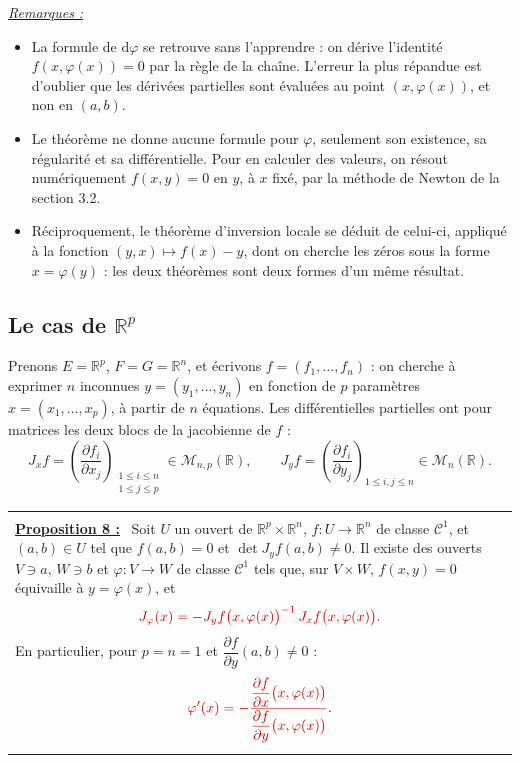 \documentclass[a4paper,twoside]{report}
\makeatletter
\newcommand{\rmath}[1]{\textcolor{rougecours}{#1}}
\newenvironment{cadre}%
 {\par\vspace{2mm}\noindent\begin{tabular}{|@{\hspace{4mm}}p{0.93\textwidth}@{\hspace{4mm}}|}
  \hline \\[-2mm]}%
 {\\[2mm] \hline \end{tabular}\par\vspace{3mm}}
\newcommand{\propo}[1]{\textbf{\underline{Proposition #1 :}}~}
\newenvironment{remarques}%
 {\par\needspace{6\baselineskip}\vspace{1mm}\begin{list}{}{\leftmargin=1cm \rightmargin=0.5cm}\item[]%
  \textit{\underline{Remarques :}}%
  \begin{itemize}[label=$\bullet$,leftmargin=0.45cm,topsep=3pt,itemsep=4pt]}%
 {\end{itemize}\end{list}\vspace{1mm}}
\newcommand{\R}{\mathbb{R}}
\newcommand{\dd}{\mathrm{d}}                      %
\newcommand{\Cc}{\mathcal{C}}                     %
\newcommand{\dpd}[2]{\dfrac{\partial #1}{\partial #2}}  %
\newcommand{\Jac}{J}                              %
\makeatother
\begin{document}
\begin{remarques}
  \item La formule de $\dd\varphi$ se retrouve sans l'apprendre : on dérive l'identité $f(x, \varphi(x)) = 0$ par la règle de la chaîne. L'erreur la plus répandue est d'oublier que les dérivées partielles sont évaluées au point $(x, \varphi(x))$, et non en $(a, b)$.
  \item Le théorème ne donne aucune formule pour $\varphi$, seulement son existence, sa régularité et sa différentielle. Pour en calculer des valeurs, on résout numériquement $f(x, y) = 0$ en $y$, à $x$ fixé, par la méthode de Newton de la section 3.2.
  \item Réciproquement, le théorème d'inversion locale se déduit de celui-ci, appliqué à la fonction $(y, x) \mapsto f(x) - y$, dont on cherche les zéros sous la forme $x = \varphi(y)$ : les deux théorèmes sont deux formes d'un même résultat.
\end{remarques}

\subsection{Le cas de \texorpdfstring{$\R^{p}$}{R\textasciicircum p}}

Prenons $E = \R^{p}$, $F = G = \R^{n}$, et écrivons $f = (f_{1}, \dots, f_{n})$ : on cherche à exprimer $n$ inconnues $y = (y_{1}, \dots, y_{n})$ en fonction de $p$ paramètres $x = (x_{1}, \dots, x_{p})$, à partir de $n$ équations. Les différentielles partielles ont pour matrices les deux blocs de la jacobienne de $f$ :
\[ \Jac_{x} f = \left(\dpd{f_{i}}{x_{j}}\right)_{\substack{1 \leqslant i \leqslant n \\ 1 \leqslant j \leqslant p}} \in \mathcal{M}_{n, p}(\R), \qquad \Jac_{y} f = \left(\dpd{f_{i}}{y_{j}}\right)_{1 \leqslant i, j \leqslant n} \in \mathcal{M}_{n}(\R). \]

\begin{cadre}
\propo{8} Soit $U$ un ouvert de $\R^{p} \times \R^{n}$, $f : U \to \R^{n}$ de classe $\Cc^{1}$, et $(a, b) \in U$ tel que $f(a, b) = 0$ et $\det \Jac_{y} f(a, b) \neq 0$. Il existe des ouverts $V \ni a$, $W \ni b$ et $\varphi : V \to W$ de classe $\Cc^{1}$ tels que, sur $V \times W$, $f(x, y) = 0$ équivaille à $y = \varphi(x)$, et
\[ \rmath{\Jac_{\varphi}(x) = -\Jac_{y} f\big(x, \varphi(x)\big)^{-1}\,\Jac_{x} f\big(x, \varphi(x)\big)}. \]
En particulier, pour $p = n = 1$ et $\dpd{f}{y}(a, b) \neq 0$ :
\[ \rmath{\varphi'(x) = -\frac{\dfrac{\partial f}{\partial x}\big(x, \varphi(x)\big)}{\dfrac{\partial f}{\partial y}\big(x, \varphi(x)\big)}}. \]
\end{cadre}
\end{document}
